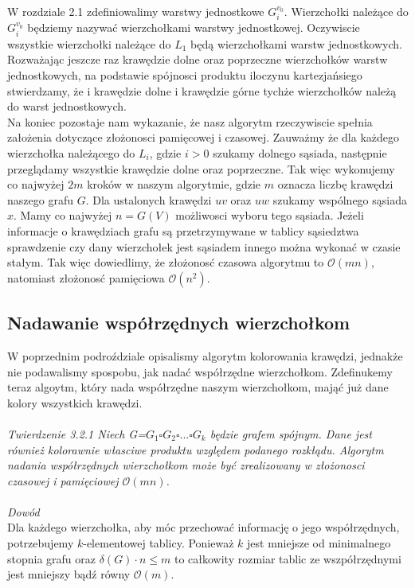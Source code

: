 \documentclass[12pt,a4paper,titlepage]{article}
\begin{document}
W rozdziale 2.1 zdefiniowalimy warstwy jednostkowe $G_i ^{v_0}$. Wierzchołki należące do $G_i ^{v_0}$ będziemy nazywać wierzchołkami warstwy jednostkowej. Oczywiscie wszystkie wierzchołki należące do $L_1$ będą wierzchołkami warstw jednostkowych.\\
Rozważając jeszcze raz krawędzie dolne oraz poprzeczne wierzchołków warstw jednostkowych, na podstawie spójnosci produktu iloczynu kartezjańsiego stwierdzamy, że i krawędzie dolne i krawędzie górne tychże wierzchołków należą do warst jednostkowych.
\\
Na koniec pozostaje nam wykazanie, że nasz algorytm rzeczywiscie spełnia założenia dotyczące złożonosci pamięcowej i czasowej. Zauważmy że dla każdego wierzchołka należącego do $L_i$, gdzie $i>0$ szukamy dolnego sąsiada, następnie przeglądamy wszystkie krawędzie dolne oraz poprzeczne. Tak więc wykonujemy co najwyżej $2m$ kroków w naszym algorytmie, gdzie $m$ oznacza liczbę krawędzi naszego grafu $G$. Dla ustalonych krawędzi $uv$ oraz $uw$ szukamy wspólnego sąsiada $x$. Mamy co najwyżej $n=G(V)$ możliwosci wyboru tego sąsiada. Jeżeli informacje o krawędziach grafu są przetrzymywane w tablicy sąsiedztwa sprawdzenie czy dany wierzchołek jest sąsiadem innego można wykonać w czasie stałym. Tak więc dowiedlimy, że złożonosć czasowa algorytmu to $\mathcal{O}(mn)$, natomiast złożonosć pamięciowa $\mathcal{O}(n^2)$.\\
\subsection{Nadawanie współrzędnych wierzchołkom}
W poprzednim podroździale opisalismy algorytm kolorowania krawędzi, jednakże nie podawalismy spospobu, jak nadać współrzędne wierzchołkom. Zdefinukemy teraz algoytm, który nada współrzędne naszym wierzchołkom, mająć już dane kolory wszystkich krawędzi.\\
\\
\textit{Twierdzenie 3.2.1 Niech G=$G_1 \square G_2 \square ... \square G_k$ będzie grafem spójnym. Dane jest również kolorawnie własciwe produktu względem podanego rozkłądu. Algorytm nadania współrzędnych wierzchołkom może być zrealizowany w złożonosci czasowej i pamięciowej $\mathcal{O}(mn)$.}\\
\\
\textit{Dowód}\\
Dla każdego wierzchołka, aby móc przechować informację o jego współrzędnych, potrzebujemy $k$-elementowej tablicy. Ponieważ $k$ jest mniejsze od minimalnego stopnia grafu oraz $\delta(G)  \cdot n \leqslant m$ to całkowity rozmiar tablic ze wszpółrzędnymi jest mniejszy bądź równy $\mathcal{O}(m)$.
\end{document}
